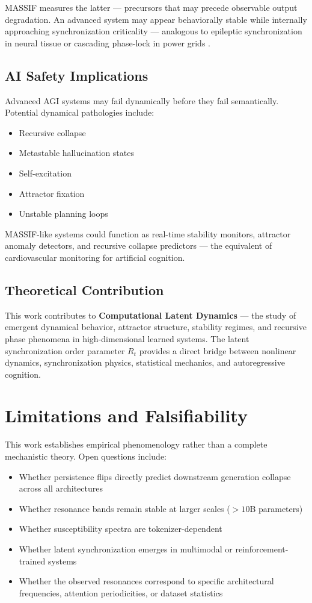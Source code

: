 \documentclass{article}
\begin{document}
MASSIF measures the latter — precursors that may precede observable output degradation. An advanced system may appear behaviorally stable while internally approaching synchronization criticality — analogous to epileptic synchronization in neural tissue or cascading phase-lock in power grids \cite{strogatz2001}.

\subsection{AI Safety Implications}

Advanced AGI systems may fail dynamically before they fail semantically. Potential dynamical pathologies include:
\begin{itemize}
    \item Recursive collapse
    \item Metastable hallucination states
    \item Self-excitation
    \item Attractor fixation
    \item Unstable planning loops
\end{itemize}

MASSIF-like systems could function as real-time stability monitors, attractor anomaly detectors, and recursive collapse predictors — the equivalent of cardiovascular monitoring for artificial cognition.

\subsection{Theoretical Contribution}

This work contributes to \textbf{Computational Latent Dynamics} — the study of emergent dynamical behavior, attractor structure, stability regimes, and recursive phase phenomena in high-dimensional learned systems. The latent synchronization order parameter $R_t$ provides a direct bridge between nonlinear dynamics, synchronization physics, statistical mechanics, and autoregressive cognition.

\section{Limitations and Falsifiability}

This work establishes empirical phenomenology rather than a complete mechanistic theory. Open questions include:

\begin{itemize}
    \item Whether persistence flips directly predict downstream generation collapse across all architectures
    \item Whether resonance bands remain stable at larger scales ($>10$B parameters)
    \item Whether susceptibility spectra are tokenizer-dependent
    \item Whether latent synchronization emerges in multimodal or reinforcement-trained systems
    \item Whether the observed resonances correspond to specific architectural frequencies, attention periodicities, or dataset statistics
\end{itemize}
\end{document}
